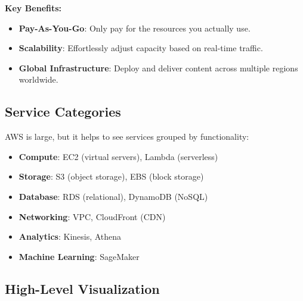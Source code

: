 \documentclass[11pt]{article}
\begin{document}
\vspace{2pt}
\textbf{Key Benefits:}
\begin{itemize}
    \item \textbf{Pay-As-You-Go}: Only pay for the resources you actually use.
    \item \textbf{Scalability}: Effortlessly adjust capacity based on real-time traffic.
    \item \textbf{Global Infrastructure}: Deploy and deliver content across multiple regions worldwide.
\end{itemize}

\subsection{Service Categories}
AWS is large, but it helps to see services grouped by functionality:

\begin{itemize}
    \item \textbf{Compute}: EC2 (virtual servers), Lambda (serverless)
    \item \textbf{Storage}: S3 (object storage), EBS (block storage)
    \item \textbf{Database}: RDS (relational), DynamoDB (NoSQL)
    \item \textbf{Networking}: VPC, CloudFront (CDN)
    \item \textbf{Analytics}: Kinesis, Athena
    \item \textbf{Machine Learning}: SageMaker
\end{itemize}

\subsection{High-Level Visualization}

\begin{center}
\end{center}
\end{document}
